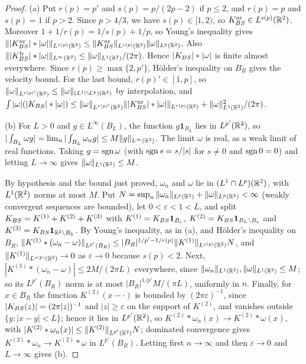 \begin{proof}
(a) Put $r(p)=p'$ and $s(p)=p/(2p-2)$ if $p\le2$, and $r(p)=p$ and $s(p)=1$ if
$p>2$. Since $p>4/3$, we have $s(p)\in[1,2)$, so $K_{BS}^{\mathrm{nr}}\in L^{s(p)}(\mathbb{R}^2)$. Moreover
$1+1/r(p)=1/s(p)+1/p$, so Young's inequality gives
$\||K_{BS}^{\mathrm{nr}}|\ast|\omega|\|_{L^{r(p)}(\mathbb{R}^2)}\le\|K_{BS}^{\mathrm{nr}}\|_{L^{s(p)}(\mathbb{R}^2)}\|\omega\|_{L^p(\mathbb{R}^2)}$.
Also $\||K_{BS}^{\mathrm{fr}}|\ast|\omega|\|_{L^\infty(\mathbb{R}^2)}\le\|\omega\|_{L^1(\mathbb{R}^2)}/(2\pi)$. Hence
$|K_{BS}|\ast|\omega|$ is finite almost everywhere. Since
$r(p)\ge\max\{2,p'\}$, H\"older's inequality on $B_R$ gives the velocity bound.
For the last bound, $r(p)'\in[1,p]$, so
$\|\omega\|_{L^{r(p)'}(\mathbb{R}^2)}\le\|\omega\|_{(L^1\cap L^p)(\mathbb{R}^2)}$ by interpolation, and
$\int|\omega|(|K_{BS}|\ast|\omega|)\le\|\omega\|_{L^{r(p)'}(\mathbb{R}^2)}\||K_{BS}^{\mathrm{nr}}|\ast|\omega|\|_{L^{r(p)}(\mathbb{R}^2)}
+\|\omega\|_{L^1(\mathbb{R}^2)}^2/(2\pi)$.

(b) For $L>0$ and $g\in L^\infty(B_L)$, the function $g\mathbf 1_{B_L}$ lies in
$L^{p'}(\mathbb{R}^2)$, so $|\int_{B_L}\omega g|=\lim_n|\int_{B_L}\omega_ng|\le
M\|g\|_{L^\infty(\mathbb{R}^2)}$. The limit $\omega$ is real, as a weak limit of real functions.
Taking $g=\operatorname{sgn}\omega$ (with $\operatorname{sgn} s=s/|s|$ for $s\ne0$ and $\operatorname{sgn}0=0$) and
letting $L\to\infty$ gives $\|\omega\|_{L^1(\mathbb{R}^2)}\le M$.

By hypothesis and the bound just proved, $\omega_n$ and $\omega$ lie in
$(L^1\cap L^p)(\mathbb{R}^2)$, with $L^1(\mathbb{R}^2)$ norms at most $M$. Put
$N=\sup_n\|\omega_n\|_{L^p(\mathbb{R}^2)}+\|\omega\|_{L^p(\mathbb{R}^2)}<\infty$ (weakly convergent
sequences are bounded), let $0<\varepsilon<1<L$, and split
$K_{BS}=K^{(1)}+K^{(2)}+K^{(3)}$ with $K^{(1)}=K_{BS}\mathbf 1_{B_\varepsilon}$,
$K^{(2)}=K_{BS}\mathbf 1_{B_L\setminus B_\varepsilon}$ and
$K^{(3)}=K_{BS}\mathbf 1_{\mathbb{R}^2\setminus B_L}$. By Young's inequality, as in (a), and
H\"older's inequality on $B_R$,
$\|K^{(1)}\ast(\omega_n-\omega)\|_{L^{p'}(B_R)}\le|B_R|^{1/p'-1/r(p)}\|K^{(1)}\|_{L^{s(p)}(\mathbb{R}^2)}N$,
and $\|K^{(1)}\|_{L^{s(p)}(\mathbb{R}^2)}\to0$ as $\varepsilon\to0$ because $s(p)<2$. Next,
$|K^{(3)}\ast(\omega_n-\omega)|\le2M/(2\pi L)$ everywhere, since
$\|\omega_n\|_{L^1(\mathbb{R}^2)},\|\omega\|_{L^1(\mathbb{R}^2)}\le M$; so its $L^{p'}(B_R)$ norm is at most
$|B_R|^{1/p'}M/(\pi L)$, uniformly in $n$. Finally, for
$x\in B_R$ the function $K^{(2)}(x-\cdot)$ is bounded by $(2\pi\varepsilon)^{-1}$,
since $|K_{BS}(z)|=(2\pi|z|)^{-1}$ and $|z|\ge\varepsilon$ on the support of
$K^{(2)}$, and vanishes outside $\{y:|x-y|<L\}$; hence it lies in $L^{p'}(\mathbb{R}^2)$, so $K^{(2)}\ast\omega_n(x)\to K^{(2)}\ast\omega(x)$, with
$|K^{(2)}\ast\omega_n(x)|\le\|K^{(2)}\|_{L^{p'}(\mathbb{R}^2)}N$; dominated convergence gives
$K^{(2)}\ast\omega_n\to K^{(2)}\ast\omega$ in $L^{p'}(B_R)$. Letting first
$n\to\infty$ and then $\varepsilon\to0$ and $L\to\infty$ gives (b).


\end{proof}
